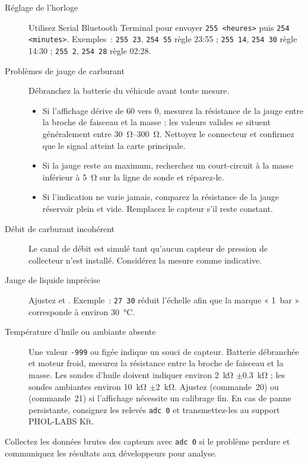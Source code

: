 \begin{description}
    \item[Réglage de l'horloge] Utilisez Serial Bluetooth Terminal pour envoyer \verb|255 <heures>| puis \verb|254 <minutes>|. Exemples~: \verb|255 23|, \verb|254 55| règle 23:55 ; \verb|255 14|, \verb|254 30| règle 14:30 ; \verb|255 2|, \verb|254 28| règle 02:28.
    \item[Problèmes de jauge de carburant] Débranchez la batterie du véhicule avant toute mesure.\begin{itemize}
        \item Si l'affichage dérive de 60 vers 0, mesurez la résistance de la jauge entre la broche de faisceau et la masse ; les valeurs valides se situent généralement entre \SIrange{30}{300}{\ohm}. Nettoyez le connecteur et confirmez que le signal atteint la carte principale.
        \item Si la jauge reste au maximum, recherchez un court-circuit à la masse inférieur à \SI{5}{\ohm} sur la ligne de sonde et réparez-le.
        \item Si l'indication ne varie jamais, comparez la résistance de la jauge réservoir plein et vide. Remplacez le capteur s'il reste constant.
    \end{itemize}
    \item[Débit de carburant incohérent] Le canal de débit est simulé tant qu'aucun capteur de pression de collecteur n'est installé. Considérez la mesure comme indicative.
    \item[Jauge de liquide imprécise] Ajustez  et . Exemple~: \verb|27 30| réduit l'échelle afin que la marque « 1~bar » corresponde à environ \SI{30}{\celsius}.
    \item[Température d'huile ou ambiante absente] Une valeur \texttt{-999} ou figée indique un souci de capteur. Batterie débranchée et moteur froid, mesurez la résistance entre la broche de faisceau et la masse. Les sondes d'huile doivent indiquer environ \SI{2}{\kilo\ohm} \ensuremath{\pm}\SI{0.3}{\kilo\ohm} ; les sondes ambiantes environ \SI{10}{\kilo\ohm} \ensuremath{\pm}\SI{2}{\kilo\ohm}. Ajustez  (commande~20) ou  (commande~21) si l'affichage nécessite un calibrage fin. En cas de panne persistante, consignez les relevés \verb|adc 0| et transmettez-les au support PHOL-LABS Kft.
\end{description}

Collectez les données brutes des capteurs avec \verb|adc 0| si le problème perdure et communiquez les résultats aux développeurs pour analyse.

